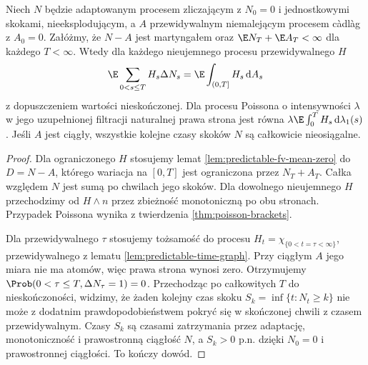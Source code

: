 \begin{twierdzenie}
\label{thm:counting-compensation}
Niech $N$ będzie adaptowanym procesem zliczającym
z $N_0=0$ i jednostkowymi skokami, nieeksplodującym,
a $A$ przewidywalnym niemalejącym procesem
c\`adl\`ag z $A_0=0$. Załóżmy, że $N-A$
jest martyngałem oraz $\E N_T+\E A_T<\infty$
dla każdego $T<\infty$. Wtedy dla każdego
nieujemnego procesu przewidywalnego $H$
\[
\E\sum_{0<s\le T}H_s\Delta N_s
=\E\int_{(0,T]}H_s\,\mathrm dA_s
\]
z dopuszczeniem wartości nieskończonej.
Dla procesu Poissona o intensywności $\lambda$
w jego uzupełnionej filtracji naturalnej
prawa strona jest równa
$\lambda\E\int_0^T H_s\,\mathrm d\lambda_1(s)$.
Jeśli $A$ jest ciągły, wszystkie kolejne czasy
skoków $N$ są całkowicie nieosiągalne.
\end{twierdzenie}
\begin{proof}
Dla ograniczonego $H$ stosujemy lemat
\ref{lem:predictable-fv-mean-zero} do $D=N-A$,
którego wariacja na $[0,T]$ jest
ograniczona przez $N_T+A_T$.
Całka względem $N$ jest sumą po chwilach
jego skoków. Dla dowolnego nieujemnego $H$
przechodzimy od $H\wedge n$ przez zbieżność
monotoniczną po obu stronach.
Przypadek Poissona wynika z twierdzenia
\ref{thm:poisson-brackets}.

Dla przewidywalnego $\tau$ stosujemy tożsamość
do procesu $H_t=\chi_{\{0<t=\tau<\infty\}}$,
przewidywalnego z lematu
\ref{lem:predictable-time-graph}.
Przy ciągłym $A$ jego miara nie ma atomów,
więc prawa strona wynosi zero.
Otrzymujemy $\Prob(0<\tau\le T,\Delta N_\tau=1)=0$.
Przechodząc po całkowitych $T$ do nieskończoności,
widzimy, że żaden kolejny czas skoku
$S_k=\inf\{t:N_t\ge k\}$ nie może z dodatnim
prawdopodobieństwem pokryć się w skończonej
chwili z czasem przewidywalnym.
Czasy $S_k$ są czasami zatrzymania przez
adaptację, monotoniczność i prawostronną
ciągłość $N$, a $S_k>0$ p.n. dzięki $N_0=0$
i prawostronnej ciągłości. To kończy dowód.
\end{proof}

